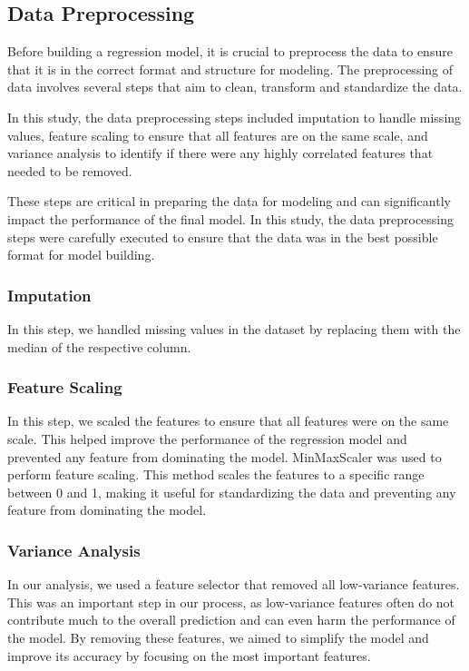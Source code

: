 \documentclass[conference]{IEEEtran}
\begin{document}
\subsection{Data Preprocessing}

Before building a regression model, it is crucial to preprocess the data to ensure that it is in the correct format and structure for modeling. The preprocessing of data involves several steps that aim to clean, transform and standardize the data.

In this study, the data preprocessing steps included imputation to handle missing values, feature scaling to ensure that all features are on the same scale, and variance analysis to identify if there were any highly correlated features that needed to be removed.

These steps are critical in preparing the data for modeling and can significantly impact the performance of the final model. In this study, the data preprocessing steps were carefully executed to ensure that the data was in the best possible format for model building.

\subsubsection{Imputation}
In this step, we handled missing values in the dataset by replacing them with the median of the respective column.

\subsubsection{Feature Scaling}
In this step, we scaled the features to ensure that all features were on the same scale. This helped improve the performance of the regression model and prevented any feature from dominating the model. MinMaxScaler was used to perform feature scaling. This method scales the features to a specific range between 0 and 1, making it useful for standardizing the data and preventing any feature from dominating the model.

\subsubsection{Variance Analysis}
In our analysis, we used a feature selector that removed all low-variance features. This was an important step in our process, as low-variance features often do not contribute much to the overall prediction and can even harm the performance of the model. By removing these features, we aimed to simplify the model and improve its accuracy by focusing on the most important features.
\end{document}
